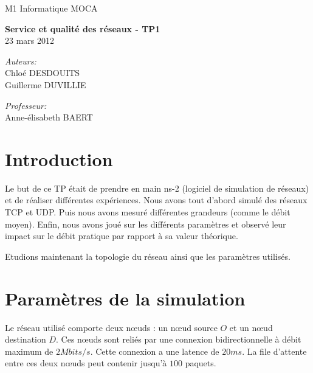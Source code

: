 \documentclass[a4paper]{article}
\begin{document}
\Large
{}

\begin{titlepage}
\begin{flushright}
M1 Informatique MOCA
\end{flushright}
\vfill
\begin{center}
{ \huge \bfseries Service et qualité des réseaux - TP1}\\[0.5cm]
23 mars 2012\\[3cm]

\begin{minipage}[c][4cm][t]{0.4\textwidth}
\raggedright \large
\emph{Auteurs:}\\
Chloé DESDOUITS\\
Guillerme DUVILLIE
\end{minipage}
\begin{minipage}[c][4cm][t]{0.4\textwidth}
\raggedleft \large
\emph{Professeur:} \\
Anne-\'elisabeth BAERT
\end{minipage}

\vfill

\end{center}
\end{titlepage}

\normalsize

\tableofcontents
\thispagestyle{empty}
\newpage


\section{Introduction}

Le but de ce TP était de prendre en main ns-2 (logiciel de simulation de réseaux) et de réaliser différentes expériences. Nous avons tout d'abord simulé des réseaux TCP et UDP. Puis nous avons mesuré différentes grandeurs (comme le débit moyen). Enfin, nous avons joué sur les différents paramètres et observé leur impact sur le débit pratique par rapport à sa valeur théorique.

Etudions maintenant la topologie du réseau ainsi que les paramètres utilisés.



\section{Paramètres de la simulation}

Le réseau utilisé comporte deux n\oe uds : un n\oe ud source $O$ et un n\oe ud destination $D$. Ces n\oe uds sont reliés par une connexion bidirectionnelle à débit maximum de $2 Mbits/s$. Cette connexion a une latence de $20ms$. La file d'attente entre ces deux n\oe uds peut contenir jusqu'à $100$ paquets.
\end{document}
